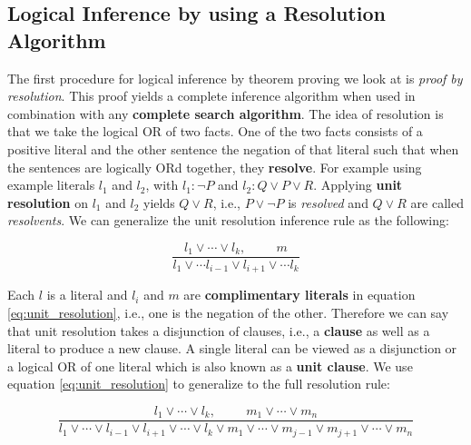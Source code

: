

\subsection{Logical Inference by using a Resolution Algorithm}
\label{sub:Inference_Resolution}

The first procedure for logical inference by theorem proving we look at is \textit{proof by resolution}. This proof yields a complete inference algorithm when used in combination with any \textbf{complete search algorithm}. The idea of resolution is that we take the logical \textsc{OR} of two facts. One of the two facts consists of a positive literal and the other sentence the negation of that literal such that when the sentences are logically \textsc{OR}d together, they \textbf{resolve}.
For example using example literals $l_1$ and $l_2$, with $l_1: \neg P$ and $l_2: Q \vee P \vee R$. Applying \textbf{unit resolution} on $l_1$ and $l_2$ yields $Q \vee R$, i.e., $P \vee \neg P$ is \textit{resolved} and $Q \vee R$ are called \textit{resolvents}.
We can generalize the unit resolution inference rule as the following:

\begin{equation}
	\dfrac{l_1 \vee \cdots \vee l_k,\hspace{1cm}  m}{l_1 \vee \cdots l_{i-1} \vee l_{i+1} \vee \cdots l_k}
	\label{eq:unit_resolution}
\end{equation}

Each $l$ is a literal and $l_i$ and $m$ are \textbf{complimentary literals} in equation \ref{eq:unit_resolution}, i.e., one is the negation of the other. Therefore we can say that unit resolution takes a disjunction of clauses, i.e., a \textbf{clause} as well as a literal to produce a new clause. A single literal can be viewed as a disjunction or a logical \textsc{OR} of one literal which is also known as a \textbf{unit clause}. We use equation \ref{eq:unit_resolution} to generalize to the full resolution rule:

\begin{equation}
\dfrac{ l_1 \vee \cdots \vee l_k,\hspace{1cm}  m_1 \vee \cdots \vee m_n}{    l_1 \vee \cdots \vee l_{i-1} \vee l_{i+1} \vee \cdots \vee l_k  \vee m_1 \vee \cdots \vee m_{j-1} \vee m_{j+1} \vee \cdots \vee m_n }
\label{eq:full_resolution}
\end{equation}


